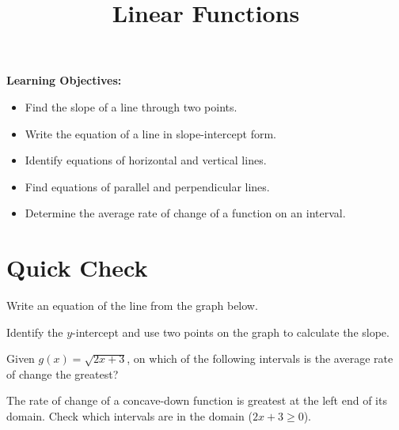 \documentclass{ximera}
\title{Linear Functions}
\begin{document}
\begin{abstract}
\end{abstract}
\maketitle

\textbf{Learning Objectives:}
\begin{itemize}
  \item Find the slope of a line through two points.
  \item Write the equation of a line in slope-intercept form.
  \item Identify equations of horizontal and vertical lines.
  \item Find equations of parallel and perpendicular lines.
  \item Determine the average rate of change of a function on an interval.
\end{itemize}
\medskip

\section*{Quick Check}

\begin{problem}
Write an equation of the line from the graph below.

\begin{center}
\end{center}

\begin{hint}
Identify the $y$-intercept and use two points on the graph to calculate the slope.
\end{hint}
\begin{multipleChoice}
\end{multipleChoice}
\end{problem}

\begin{problem}
Given $g(x) = \sqrt{2x+3}$, on which of the following intervals is the average rate of change the greatest?
\begin{hint}
The rate of change of a concave-down function is greatest at the left end of its domain. Check which intervals are in the domain ($2x+3 \geq 0$).
\end{hint}
\begin{multipleChoice}
  \choice{$[1,2]$}
  \choice{$[-3,-2]$}
  \choice{$[0,1]$}
  \choice{$[-2,-1]$}
  \choice[correct]{$[-1,0]$}
\end{multipleChoice}
\end{problem}
\end{document}
